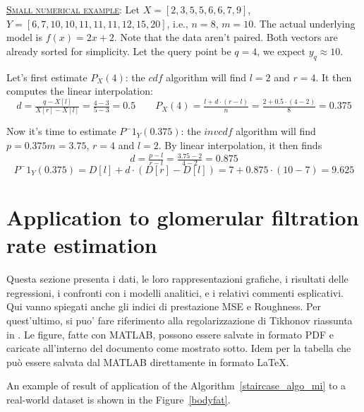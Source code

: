 \documentclass[10pt,final]{siamltex}
\begin{document}
\begin{tcolorbox}[colback=gray!30,%
  colframe=black,%
  width=\dimexpr\linewidth-2\fboxrule\relax,
  arc=3mm, auto outer arc,
  breakable
  ]
  \underline{\textsc{Small numerical example}}: Let $X=[2,3,5,5,6,6,7,9]$, $Y=[6,7,10,10,11,11,11,12,15,20]$, i.e., $n=8$, $m=10$. The actual underlying model is $f(x)=2x+2$. Note that the data aren't paired. Both vectors are already sorted for simplicity. Let the query point be $q=4$, we expect $y_q\approx10$.

Let's first estimate $P_X(4)$: the $cdf$ algorithm will find $l=2$ and $r=4$. It then computes the linear interpolation:
  \begin{equation*}
    d = \tfrac{q-X[l]}{X[r]-X[l]} = \tfrac{4-3}{5-3} = 0.5
    \quad\quad
    P_X(4)=\tfrac{l+d\cdot(r-l)}{n}=\tfrac{2+0.5\cdot(4-2)}{8}=0.375
  \end{equation*}

Now it's time to estimate $P^-1_Y(0.375)$: the $invcdf$ algorithm will find $p = 0.375  m=3.75$, $r=4$ and $l=2$. By linear interpolation, it then finds
    \begin{equation*}
      d = \tfrac{p-l}{r-l} = \tfrac{3.75-2}{4-2} = 0.875
    \end{equation*}
    \begin{equation*}
      P^-1_Y(0.375)=D[l]+d\cdot(D[r]-D[l])=7+0.875\cdot(10-7)=9.625
    \end{equation*}
\end{tcolorbox}
%
\section{Application to glomerular filtration rate estimation}\label{sec3}
%
{{\red Questa sezione presenta i dati, le loro rappresentazioni grafiche, i risultati delle regressioni, i confronti con i modelli analitici, e i relativi commenti esplicativi. Qui vanno spiegati anche gli indici di prestazione MSE e Roughness. Per quest'ultimo, si puo' fare riferimento alla regolarizzazione di Tikhonov riassunta in \cite{bishop}. Le figure, fatte con MATLAB, possono essere salvate in formato PDF e caricate all'interno del documento come mostrato sotto. Idem per la tabella che può essere salvata dal MATLAB direttamente in formato LaTeX.}}

An example of result of application of the Algorithm~\ref{staircase_algo_mi} to a real-world dataset is shown in the Figure~\ref{bodyfat}.
\end{document}
